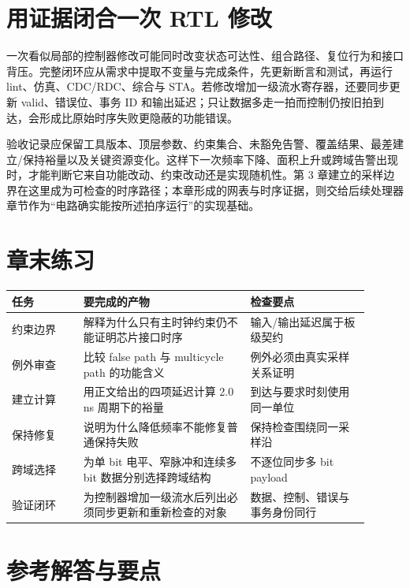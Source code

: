 \section{用证据闭合一次 RTL 修改}

一次看似局部的控制器修改可能同时改变状态可达性、组合路径、复位行为和接口背压。完整闭环应从需求中提取不变量与完成条件，先更新断言和测试，再运行 lint、仿真、CDC/RDC、综合与 STA。若修改增加一级流水寄存器，还要同步更新 valid、错误位、事务 ID 和输出延迟；只让数据多走一拍而控制仍按旧拍到达，会形成比原始时序失败更隐蔽的功能错误。

验收记录应保留工具版本、顶层参数、约束集合、未豁免告警、覆盖结果、最差建立/保持裕量以及关键资源变化。这样下一次频率下降、面积上升或跨域告警出现时，才能判断它来自功能改动、约束改动还是实现随机性。第 3 章建立的采样边界在这里成为可检查的时序路径；本章形成的网表与时序证据，则交给后续处理器章节作为“电路确实能按所述拍序运行”的实现基础。

\section*{章末练习}

\begin{longtable}{L{0.18\linewidth}L{0.42\linewidth}L{0.30\linewidth}}
\toprule
任务 & 要完成的产物 & 检查要点 \\
\midrule
约束边界 & 解释为什么只有主时钟约束仍不能证明芯片接口时序 & 输入/输出延迟属于板级契约 \\
例外审查 & 比较 false path 与 multicycle path 的功能含义 & 例外必须由真实采样关系证明 \\
建立计算 & 用正文给出的四项延迟计算 2.0 ns 周期下的裕量 & 到达与要求时刻使用同一单位 \\
保持修复 & 说明为什么降低频率不能修复普通保持失败 & 保持检查围绕同一采样沿 \\
跨域选择 & 为单 bit 电平、窄脉冲和连续多 bit 数据分别选择跨域结构 & 不逐位同步多 bit payload \\
验证闭环 & 为控制器增加一级流水后列出必须同步更新和重新检查的对象 & 数据、控制、错误与事务身份同行 \\
\bottomrule
\end{longtable}

\section*{参考解答与要点}

